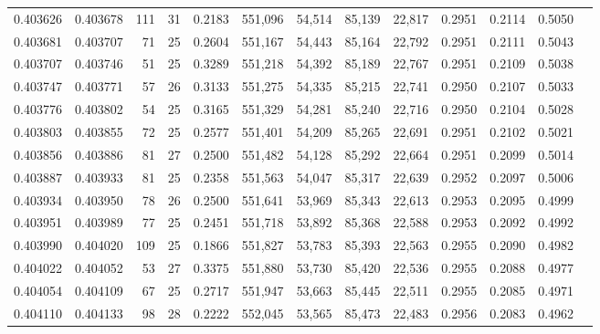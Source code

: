 \begin{tabular}{rrrrrrrrrrrrr}
0.403626 & 0.403678 &   111 &  31 &                                     0.2183 & 551,096 &  54,514 &  85,139 &  22,817 & 0.2951 & 0.2114 & 0.5050 \\
0.403681 & 0.403707 &    71 &  25 &                                     0.2604 & 551,167 &  54,443 &  85,164 &  22,792 & 0.2951 & 0.2111 & 0.5043 \\
0.403707 & 0.403746 &    51 &  25 &                                     0.3289 & 551,218 &  54,392 &  85,189 &  22,767 & 0.2951 & 0.2109 & 0.5038 \\
0.403747 & 0.403771 &    57 &  26 &                                     0.3133 & 551,275 &  54,335 &  85,215 &  22,741 & 0.2950 & 0.2107 & 0.5033 \\
0.403776 & 0.403802 &    54 &  25 &                                     0.3165 & 551,329 &  54,281 &  85,240 &  22,716 & 0.2950 & 0.2104 & 0.5028 \\
0.403803 & 0.403855 &    72 &  25 &                                     0.2577 & 551,401 &  54,209 &  85,265 &  22,691 & 0.2951 & 0.2102 & 0.5021 \\
0.403856 & 0.403886 &    81 &  27 &                                     0.2500 & 551,482 &  54,128 &  85,292 &  22,664 & 0.2951 & 0.2099 & 0.5014 \\
0.403887 & 0.403933 &    81 &  25 &                                     0.2358 & 551,563 &  54,047 &  85,317 &  22,639 & 0.2952 & 0.2097 & 0.5006 \\
0.403934 & 0.403950 &    78 &  26 &                                     0.2500 & 551,641 &  53,969 &  85,343 &  22,613 & 0.2953 & 0.2095 & 0.4999 \\
0.403951 & 0.403989 &    77 &  25 &                                     0.2451 & 551,718 &  53,892 &  85,368 &  22,588 & 0.2953 & 0.2092 & 0.4992 \\
0.403990 & 0.404020 &   109 &  25 &                                     0.1866 & 551,827 &  53,783 &  85,393 &  22,563 & 0.2955 & 0.2090 & 0.4982 \\
0.404022 & 0.404052 &    53 &  27 &                                     0.3375 & 551,880 &  53,730 &  85,420 &  22,536 & 0.2955 & 0.2088 & 0.4977 \\
0.404054 & 0.404109 &    67 &  25 &                                     0.2717 & 551,947 &  53,663 &  85,445 &  22,511 & 0.2955 & 0.2085 & 0.4971 \\
0.404110 & 0.404133 &    98 &  28 &                                     0.2222 & 552,045 &  53,565 &  85,473 &  22,483 & 0.2956 & 0.2083 & 0.4962 \\

\end{tabular}
